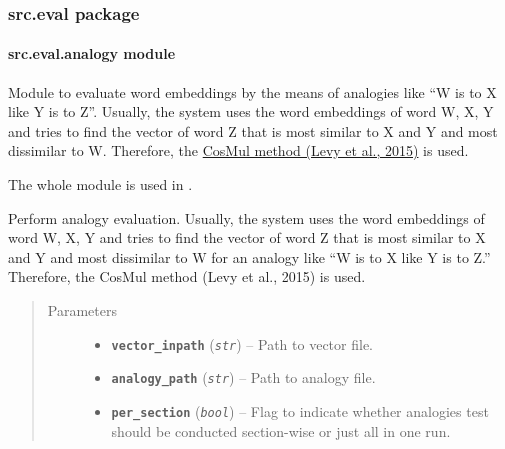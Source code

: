 \documentclass[letterpaper,10pt,english]{sphinxmanual}
\begin{document}
\subsubsection{src.eval package}
\label{src.eval::doc}\label{src.eval:src-eval-package}

\paragraph{src.eval.analogy module}
\label{src.eval:module-src.eval.analogy}\label{src.eval:src-eval-analogy-module}
Module to evaluate word embeddings by the means of analogies like ``W is to X like Y is to Z''. Usually,
the system uses the word embeddings of word W, X, Y and tries to find the vector of word Z that is most similar to
X and Y and most dissimilar to W.
Therefore, the \href{https://transacl.org/ojs/index.php/tacl/article/viewFile/570/124}{CosMul method (Levy et al., 2015)}
is used.

The whole module is used in .

\begin{fulllineitems}
\label{src.eval:src.eval.analogy.analogy_eval}
Perform analogy evaluation. Usually, the system uses the word embeddings of word W, X, Y and tries to find the
vector of word Z that is most similar to
X and Y and most dissimilar to W for an analogy like ``W is to X like Y is to Z.''
Therefore, the CosMul method (Levy et al., 2015) is used.
\begin{quote}\begin{description}
\item[{Parameters}] \leavevmode\begin{itemize}
\item {} 
\textbf{\texttt{vector\_inpath}} (\emph{\texttt{str}}) -- Path to  vector file.

\item {} 
\textbf{\texttt{analogy\_path}} (\emph{\texttt{str}}) -- Path to analogy file.

\item {} 
\textbf{\texttt{per\_section}} (\emph{\texttt{bool}}) -- Flag to indicate whether analogies test should be conducted section-wise or just all in
one run.

\end{itemize}

\end{description}\end{quote}

\end{fulllineitems}
\end{document}
